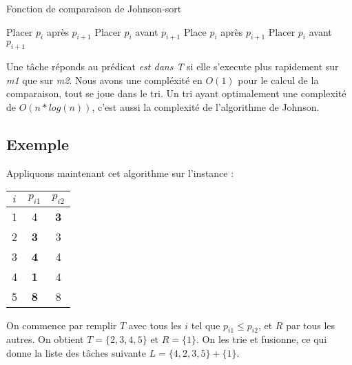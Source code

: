 \begin{algorithm}
\caption{Fonction de comparaison de Johnson-sort}
\begin{algorithmic}
		\STATE {}
		\STATE Placer $p_i$ après $p_{i+1}$
	\ELSE
		\STATE {}
		\STATE Placer $p_i$ avant $p_{i+1}$
	\ENDIF
\ELSE
		\STATE {}
		\STATE Place $p_i$ après $p_{i+1}$
	\ELSE
		\STATE {}
		\STATE Placer $p_i$ avant $p_{i+1}$ 
	\ENDIF
\ENDIF
\end{algorithmic}
\end{algorithm}

Une tâche réponds au prédicat {\em est dans T} si elle s'execute plus rapidement
sur {\em m1} que sur {\em m2}.
Nous avons une compléxité en $O(1)$ pour le calcul de la comparaison, tout se joue
dans le tri. Un tri ayant optimalement une complexité de $O(n*log(n))$, c'est
aussi la complexité de l'algorithme de Johnson.

\subsection{Exemple}
Appliquons maintenant cet algorithme sur l'instance :

\begin{center}
\begin{tabular}{|c|c|c|}
\hline
$i$ & $p_{i1}$ & $p_{i2}$ \\
\hline
1 & 4 & \textbf{3} \\
\hline
2 & \textbf{3} & 3 \\
\hline
3 & \textbf{4} & 4 \\
\hline
4 & \textbf{1} & 4 \\
\hline
5 & \textbf{8} & 8 \\
\hline
\end{tabular}
\end{center}

On commence par remplir $T$ avec tous les $i$ tel que $p_{i1} \le p_{i2}$, et
$R$ par tous les autres.
On obtient $T = \{2,3,4,5\}$ et $R = \{1\}$.
On les trie et fusionne, ce qui donne la liste des tâches 
suivante $L = \{4,2,3,5\} + \{1\}$.
